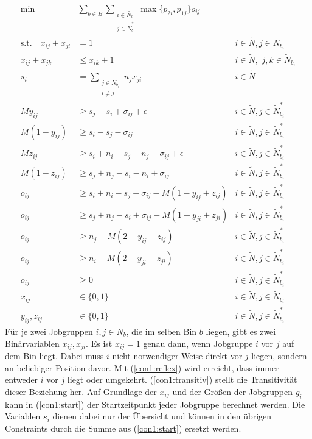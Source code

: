 \documentclass{scrreprt}
\begin{document}
\begin{align}
    \text{min}\quad &\sum_{b\in B}\sum_{\substack{i\in \tilde{N_b}\\j\in \tilde{N}_b^*}} 
            \max\{p_{2i},p_{1j}\}o_{ij} \label{objfunc1}\\
			\text{s.t.} \quad x_{ij} + x_{ji} &= 1 &i\in \tilde{N}, j\in \tilde{N}_{b_i} \label{con1:reflex}\\
			x_{ij} + x_{jk} &\leq x_{ik} + 1 &i\in \tilde{N},\,\, j,k\in \tilde{N}_{b_i} \label{con1:transitiv} \\
			s_i &= \sum_{\substack{j\in \tilde{N}_{b_i}\\i\neq j}} n_j x_{ji} &i\in \tilde{N} \label{con1:start} \\
            My_{ij} &\geq s_j - s_i + \sigma_{ij} + \epsilon &i\in \tilde{N}, j\in \tilde{N}^*_{b_i} \label{con1:y1} \\
            M(1-y_{ij}) &\geq s_i - s_j - \sigma_{ij} &i\in \tilde{N}, j\in \tilde{N}^*_{b_i} \label{con1:y2} \\
            Mz_{ij} &\geq s_i + n_i - s_j - n_j - \sigma_{ij} + \epsilon &i\in \tilde{N}, j\in \tilde{N}^*_{b_i} \label{con1:z1} \\
            M(1-z_{ij}) &\geq s_j + n_j- s_i - n_i + \sigma_{ij} &i\in \tilde{N}, j\in \tilde{N}^*_{b_i} \label{con1:z2} \\
            o_{ij} &\geq s_i + n_i - s_j - \sigma_{ij} - M(1-y_{ij}+z_{ij}) &i\in \tilde{N}, j\in \tilde{N}^*_{b_i} \label{con1:o1} \\
            o_{ij} &\geq s_j + n_j - s_i + \sigma_{ij} - M(1-y_{ji}+z_{ji}) &i\in \tilde{N}, j\in \tilde{N}^*_{b_i} \label{con1:o2} \\
            o_{ij} &\geq n_j - M(2-y_{ij}-z_{ij}) &i\in \tilde{N}, j\in \tilde{N}^*_{b_i} \label{con1:o3} \\
            o_{ij} &\geq n_i - M(2-y_{ji}-z_{ji}) &i\in \tilde{N}, j\in \tilde{N}^*_{b_i} \label{con1:o4} \\
            o_{ij} &\geq 0 &i\in \tilde{N}, j\in \tilde{N}^*_{b_i} \label{con1:o5} \\
            x_{ij} &\in \{0,1\} &i\in \tilde{N}, j\in \tilde{N}_{b_i} \\
            y_{ij},z_{ij} &\in \{0,1\} &i\in \tilde{N}, j\in \tilde{N}^*_{b_i}
\end{align}
Für je zwei Jobgruppen $i,j\in N_b$, die im selben Bin $b$ liegen, gibt es
zwei Binärvariablen $x_{ij},x_{ji}$. Es ist $x_{ij}=1$ genau dann, wenn 
Jobgruppe $i$ vor $j$ auf dem Bin liegt. Dabei muss $i$ nicht notwendiger
Weise direkt vor $j$ liegen, sondern an beliebiger Position davor.
Mit (\ref{con1:reflex}) wird erreicht, dass immer entweder $i$ vor $j$ liegt
oder umgekehrt. (\ref{con1:transitiv}) stellt die Transitivität dieser Beziehung
her. Auf Grundlage der $x_{ij}$ und der Größen der Jobgruppen $g_i$ 
kann in (\ref{con1:start}) der Startzeitpunkt jeder Jobgruppe berechnet werden.
Die Variablen $s_i$ dienen dabei nur der Übersicht und können in den übrigen 
Constraints durch die Summe aus (\ref{con1:start}) ersetzt werden.
\end{document}
